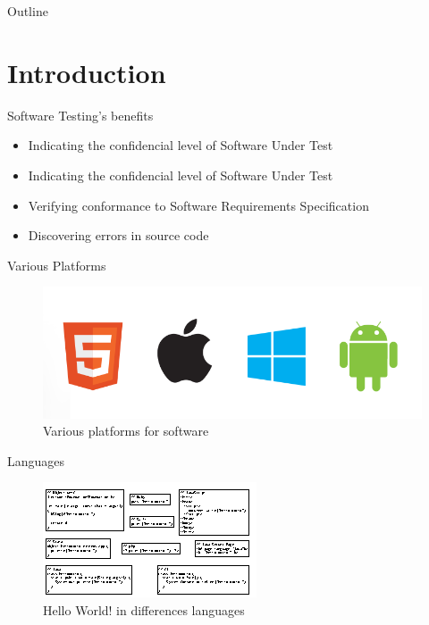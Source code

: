 \documentclass{beamer}
\title{\ThesisNameEN}
\subtitle{IMECS2017}
\date[2017.03.14]{\today}
\author{\authorNameEN~\small{and~\advisorEn}}
\institute{{\facultyEn}, {\universityEn}}
\begin{document}
\maketitle

\begin{frame}[t]{Outline}
    \tableofcontents[hideallsubsections]
\end{frame}

%
\section{Introduction}
\begin{frame}{Software Testing's benefits}
  \begin{itemize}
     \item Indicating the confidencial level of Software Under Test
     \item Indicating the confidencial level of Software Under Test
     \item Verifying conformance to Software Requirements Specification
     \item Discovering errors in source code
  \end{itemize}
\end{frame}

\begin{frame}{Various Platforms}
    \begin{figure}
        \includegraphics[width=.8\paperwidth]{figure/mobile_bugs}
        \caption{Various platforms for software}
        \label{fig:variousplatform}
    \end{figure}
\end{frame}

\begin{frame}{Languages}
    \begin{figure}
        \includegraphics[width=.9\paperwidth]{figure/hello-world-lang}
        \caption{Hello World! in differences languages}
        \label{fig:helloworld}
    \end{figure}
\end{frame}
\end{document}
